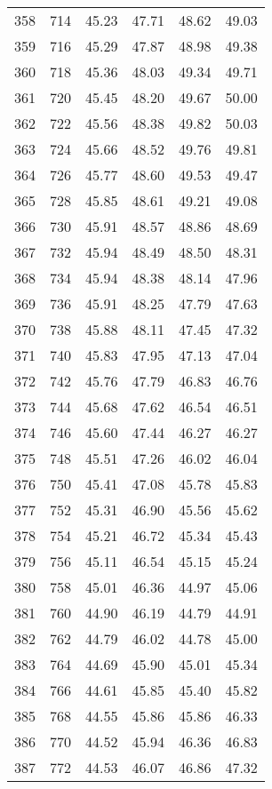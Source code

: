 \begin{longtable}{rrllll}
		358 & 714 & 45.23 & 47.71 & 48.62 & 49.03 \\ 
		359 & 716 & 45.29 & 47.87 & 48.98 & 49.38 \\ 
		360 & 718 & 45.36 & 48.03 & 49.34 & 49.71 \\ 
		361 & 720 & 45.45 & 48.20 & 49.67 & 50.00 \\ 
		362 & 722 & 45.56 & 48.38 & 49.82 & 50.03 \\ 
		363 & 724 & 45.66 & 48.52 & 49.76 & 49.81 \\ 
		364 & 726 & 45.77 & 48.60 & 49.53 & 49.47 \\ 
		365 & 728 & 45.85 & 48.61 & 49.21 & 49.08 \\ 
		366 & 730 & 45.91 & 48.57 & 48.86 & 48.69 \\ 
		367 & 732 & 45.94 & 48.49 & 48.50 & 48.31 \\ 
		368 & 734 & 45.94 & 48.38 & 48.14 & 47.96 \\ 
		369 & 736 & 45.91 & 48.25 & 47.79 & 47.63 \\ 
		370 & 738 & 45.88 & 48.11 & 47.45 & 47.32 \\ 
		371 & 740 & 45.83 & 47.95 & 47.13 & 47.04 \\ 
		372 & 742 & 45.76 & 47.79 & 46.83 & 46.76 \\ 
		373 & 744 & 45.68 & 47.62 & 46.54 & 46.51 \\ 
		374 & 746 & 45.60 & 47.44 & 46.27 & 46.27 \\ 
		375 & 748 & 45.51 & 47.26 & 46.02 & 46.04 \\ 
		376 & 750 & 45.41 & 47.08 & 45.78 & 45.83 \\ 
		377 & 752 & 45.31 & 46.90 & 45.56 & 45.62 \\ 
		378 & 754 & 45.21 & 46.72 & 45.34 & 45.43 \\ 
		379 & 756 & 45.11 & 46.54 & 45.15 & 45.24 \\ 
		380 & 758 & 45.01 & 46.36 & 44.97 & 45.06 \\ 
		381 & 760 & 44.90 & 46.19 & 44.79 & 44.91 \\ 
		382 & 762 & 44.79 & 46.02 & 44.78 & 45.00 \\ 
		383 & 764 & 44.69 & 45.90 & 45.01 & 45.34 \\ 
		384 & 766 & 44.61 & 45.85 & 45.40 & 45.82 \\ 
		385 & 768 & 44.55 & 45.86 & 45.86 & 46.33 \\ 
		386 & 770 & 44.52 & 45.94 & 46.36 & 46.83 \\ 
		387 & 772 & 44.53 & 46.07 & 46.86 & 47.32 \\ 

\end{longtable}
